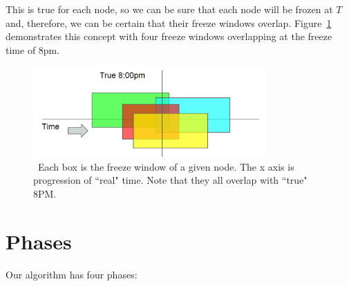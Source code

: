 This is true for 
each node, so we can be sure that each node will be frozen at $T$ and, 
therefore, we can be certain that their freeze windows overlap.
Figure~\ref{fig:overlapping-windows} demonstrates this concept with
four freeze windows overlapping at the freeze time of 8pm.

\begin{figure}[!htbp]
  \centering
  \includegraphics[width=0.8\textwidth]{overlapping-windows.png}
  \caption{~Each box is the freeze window of a given node. The x axis is progression of ``real" time. Note that they all overlap with ``true" 8PM.}
  \label{fig:overlapping-windows}
\end{figure}


\section{Phases}
Our algorithm has four phases:

